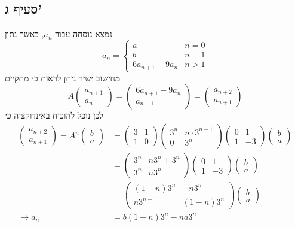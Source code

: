 \subsection{סעיף ג'}
נמצא נוסחה עבור $a_n$, כאשר נתון
\[
	a_n = \begin{cases}
		a & n = 0 \\
		b & n = 1 \\
		6a_{n + 1} - 9a_n & n > 1
	\end{cases}
\]
מחישוב ישיר ניתן לראות כי מתקיים
\[
	A \begin{pmatrix}
		a_{n + 1} \\
		a_n
	\end{pmatrix}
	=
	\begin{pmatrix}
		6a_{n + 1} - 9a_n \\
		a_{n + 1}
	\end{pmatrix}
	= \begin{pmatrix}
		a_{n + 2} \\
		a_{n + 1}
	\end{pmatrix}
\]
לכן נוכל להוכיח באינדוקציה כי
\begin{align*}
	\begin{pmatrix}
		a_{n + 2} \\
		a_{n + 1}
	\end{pmatrix}
	= A^n \begin{pmatrix}
		b \\
		a
	\end{pmatrix}
	& = \begin{pmatrix}
		3 & 1 \\
		1 & 0
	\end{pmatrix}
	\begin{pmatrix}
		3^{n} & n \cdot 3^{n - 1} \\
		0 & 3^{n}
	\end{pmatrix}
	\begin{pmatrix}
		0 & 1 \\
		1 & -3
	\end{pmatrix}
	\begin{pmatrix}
		b \\
		a
	\end{pmatrix} \\
	& = \begin{pmatrix}
		3^n & n 3^n + 3^n \\
		3^n & n 3^{n - 1}
	\end{pmatrix}
	\begin{pmatrix}
		0 & 1 \\
		1 & -3
	\end{pmatrix}
	\begin{pmatrix}
		b \\
		a
	\end{pmatrix} \\
	& = \begin{pmatrix}
		(1 + n)3^n & -n 3^n \\
		n 3^{n - 1} & (1 - n) 3^n
	\end{pmatrix}
	\begin{pmatrix}
		b \\
		a
	\end{pmatrix} \\
	\rightarrow a_n & = b(1 + n)3^n - n a 3^n
\end{align*}

